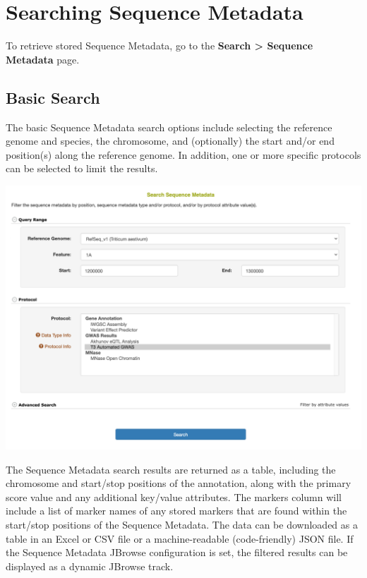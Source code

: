 \documentclass[
  12pt,
]{book}
\begin{document}
\hypertarget{searching-sequence-metadata}{%
\section{Searching Sequence Metadata}\label{searching-sequence-metadata}}

To retrieve stored Sequence Metadata, go to the \textbf{Search \textgreater{} Sequence Metadata} page.

\hypertarget{basic-search}{%
\subsection{Basic Search}\label{basic-search}}

The basic Sequence Metadata search options include selecting the reference genome and species, the chromosome, and (optionally) the start and/or end position(s) along the reference genome. In addition, one or more specific protocols can be selected to limit the results.

\begin{center}\includegraphics[width=0.95\linewidth]{assets/images/sequence_metadata_search_basic} \end{center}

The Sequence Metadata search results are returned as a table, including the chromosome and start/stop positions of the annotation, along with the primary score value and any additional key/value attributes. The markers column will include a list of marker names of any stored markers that are found within the start/stop positions of the Sequence Metadata. The data can be downloaded as a table in an Excel or CSV file or a machine-readable (code-friendly) JSON file. If the Sequence Metadata JBrowse configuration is set, the filtered results can be displayed as a dynamic JBrowse track.
\end{document}
